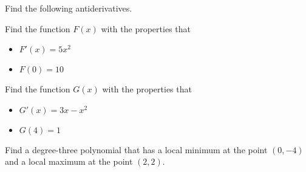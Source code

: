 
Find the following antiderivatives.

\begin{multicols}{2}
 \begin{ProblemSet}[pencil space=3.75in]
 \end{ProblemSet}
\end{multicols}

\begin{ProblemSet}
 \begin{Problem}
  Find the function $F(x)$ with the properties that
  \begin{itemize}
  \item $F'(x) = 5 x^2$
  \item $F(0) = 10$
  \end{itemize}
 \end{Problem}
 \begin{Problem}
  Find the function $G(x)$ with the properties that
  \begin{itemize}
  \item $G'(x) = 3 x - x^2$
  \item $G(4) = 1$
  \end{itemize}
 \end{Problem}
 \begin{Problem}
  Find a degree-three polynomial that has a local minimum at the point $(0, -4)$ and a local maximum at the point $(2, 2)$.
 \end{Problem}
\end{ProblemSet}

